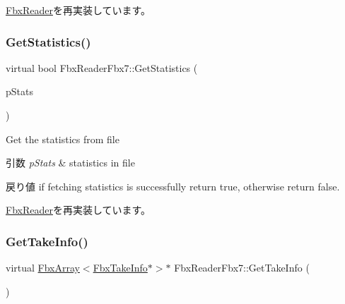 \hyperlink{class_fbx_reader_acb928634641ad5f99d709478c7a234be}{Fbx\+Reader}を再実装しています。

\mbox{\label{class_fbx_reader_fbx7_a674cd0632a4d854d8a7dceb51179e8c9}} 
\subsubsection{\texorpdfstring{Get\+Statistics()}{GetStatistics()}}
{\footnotesize\ttfamily virtual bool Fbx\+Reader\+Fbx7\+::\+Get\+Statistics (\begin{DoxyParamCaption}\item[{\hyperlink{class_fbx_statistics}{Fbx\+Statistics} $\ast$}]{p\+Stats }\end{DoxyParamCaption})\hspace{0.3cm}{\ttfamily [virtual]}}

Get the statistics from file 
\begin{DoxyParams}{引数}
{\em p\+Stats} & statistics in file \\
\hline
\end{DoxyParams}
\begin{DoxyReturn}{戻り値}
if fetching statistics is successfully return {\ttfamily true}, otherwise return {\ttfamily false}. 
\end{DoxyReturn}


\hyperlink{class_fbx_reader_ae14762357b4a8ecce10a266b06cc3117}{Fbx\+Reader}を再実装しています。

\mbox{\label{class_fbx_reader_fbx7_a220f07e0cb0c171279e1f98e0433bbee}} 
\subsubsection{\texorpdfstring{Get\+Take\+Info()}{GetTakeInfo()}}
{\footnotesize\ttfamily virtual \hyperlink{class_fbx_array}{Fbx\+Array}$<$\hyperlink{class_fbx_take_info}{Fbx\+Take\+Info}$\ast$$>$$\ast$ Fbx\+Reader\+Fbx7\+::\+Get\+Take\+Info (\begin{DoxyParamCaption}{ }\end{DoxyParamCaption})\hspace{0.3cm}{\ttfamily [virtual]}}

